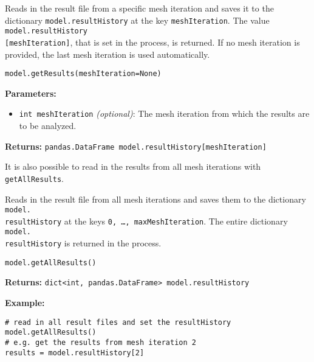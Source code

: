 \documentclass[12pt]{article}
\begin{document}
\begin{mdframed}[backgroundcolor=gray!10, roundcorner=10pt,
		linewidth=1pt]

	Reads in the result file from a specific mesh iteration and saves it to
	the dictionary \texttt{model.resultHistory} at the key \texttt{meshIteration}.
	The value \texttt{model.resultHistory} \\ \texttt{[meshIteration]}, that is set in the
	process, is returned. If no mesh iteration is provided, the last mesh iteration
	is used automatically.

	\begin{lstlisting}
model.getResults(meshIteration=None)
		\end{lstlisting}
	\label{getResults}
	\textbf{Parameters:}
	\begin{itemize}
		\item \texttt{int meshIteration} \emph{(optional)}: The mesh
		      iteration from which the results are to be analyzed.
	\end{itemize}

	\textbf{Returns:} \texttt{pandas.DataFrame
		model.resultHistory[meshIteration]}

\end{mdframed}

It is also possible to read in the results from all mesh iterations with
\texttt{getAllResults}.

\begin{mdframed}[backgroundcolor=gray!10, roundcorner=10pt,
		linewidth=1pt]

	Reads in the result file from all mesh iterations and saves them to the
	dictionary \texttt{model.\\resultHistory} at the keys \texttt{0, \ldots,
		maxMeshIteration}. The entire dictionary \texttt{model.\\resultHistory} is
	returned in the process.

	\begin{lstlisting}
model.getAllResults()
		\end{lstlisting}
	\label{getAllResults}

	\textbf{Returns:} \texttt{dict<int, pandas.DataFrame>
		model.resultHistory}

	\textbf{Example:} \begin{lstlisting}
# read in all result files and set the resultHistory
model.getAllResults()
# e.g. get the results from mesh iteration 2
results = model.resultHistory[2]  
	\end{lstlisting}

\end{mdframed}
\end{document}
